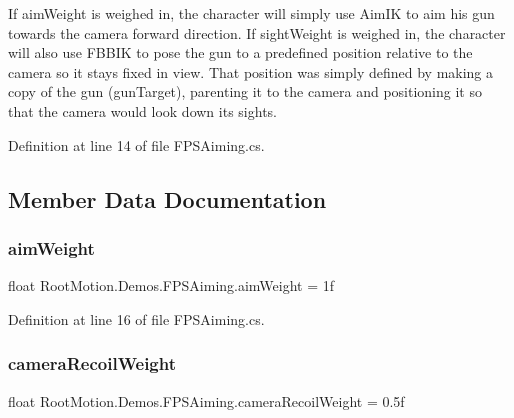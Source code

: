 If aim\+Weight is weighed in, the character will simply use Aim\+IK to aim his gun towards the camera forward direction. If sight\+Weight is weighed in, the character will also use F\+B\+B\+IK to pose the gun to a predefined position relative to the camera so it stays fixed in view. That position was simply defined by making a copy of the gun (gun\+Target), parenting it to the camera and positioning it so that the camera would look down it\textquotesingle{}s sights. 

Definition at line 14 of file F\+P\+S\+Aiming.\+cs.



\subsection{Member Data Documentation}
\mbox{\label{class_root_motion_1_1_demos_1_1_f_p_s_aiming_af39807c2c9f238249017e4a69ac7c7b1}} 
\subsubsection{\texorpdfstring{aim\+Weight}{aimWeight}}
{\footnotesize\ttfamily float Root\+Motion.\+Demos.\+F\+P\+S\+Aiming.\+aim\+Weight = 1f}



Definition at line 16 of file F\+P\+S\+Aiming.\+cs.

\mbox{\label{class_root_motion_1_1_demos_1_1_f_p_s_aiming_aa0748cd8c090bce863166c077a19b530}} 
\subsubsection{\texorpdfstring{camera\+Recoil\+Weight}{cameraRecoilWeight}}
{\footnotesize\ttfamily float Root\+Motion.\+Demos.\+F\+P\+S\+Aiming.\+camera\+Recoil\+Weight = 0.\+5f}



